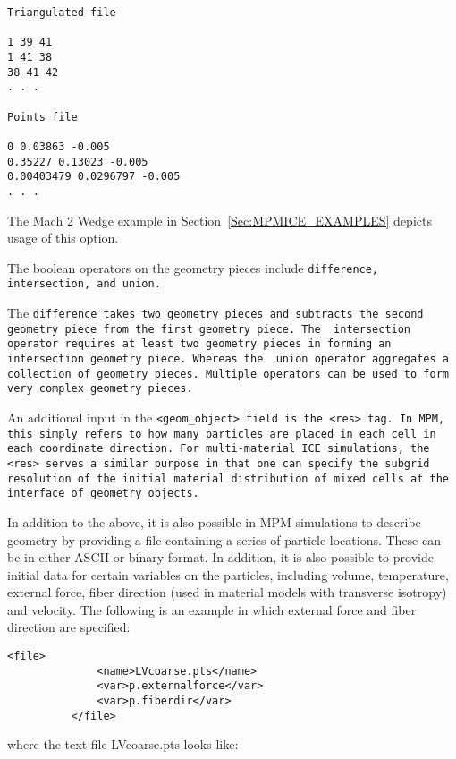 \begin{Verbatim}[fontsize=\footnotesize]
Triangulated file

1 39 41
1 41 38
38 41 42
. . .

Points file

0 0.03863 -0.005
0.35227 0.13023 -0.005
0.00403479 0.0296797 -0.005
. . .
\end{Verbatim}
The Mach 2 Wedge example in Section~\ref{Sec:MPMICE_EXAMPLES} depicts usage of
this option.

The boolean operators on the geometry pieces include \tt difference,
intersection, \normalfont and \tt union.\normalfont

The \tt difference \normalfont takes two geometry pieces and subtracts
the second geometry piece from the first geometry piece.  The \tt
intersection \normalfont operator requires at least two geometry
pieces in forming an intersection geometry piece.  Whereas the \tt
union \normalfont operator aggregates a collection of geometry pieces.
Multiple operators can be used to form very complex geometry pieces.

An additional input in the \tt <geom\_object> \normalfont field is the
\tt <res> \normalfont tag.  In MPM, this simply refers to how many particles
are placed in each cell in each coordinate direction.  For multi-material ICE
simulations, the \tt <res> \normalfont serves a similar purpose in that one
can specify the subgrid resolution of the initial material distribution
of mixed cells at the interface of geometry objects.

In addition to the above, it is also possible in MPM simulations to describe
geometry by providing a file containing a series of particle locations.  These
can be in either ASCII or binary format.  In addition, it is also possible to
provide initial data for certain variables on the particles, including
volume, temperature, external force, fiber direction (used in material models
with transverse isotropy) and velocity.  The following is an example in which
external force and fiber direction are specified:

\begin{Verbatim}[fontsize=\footnotesize]
          <file>
              <name>LVcoarse.pts</name>
              <var>p.externalforce</var>
              <var>p.fiberdir</var>
          </file>
\end{Verbatim}

where the text file LVcoarse.pts looks like:

